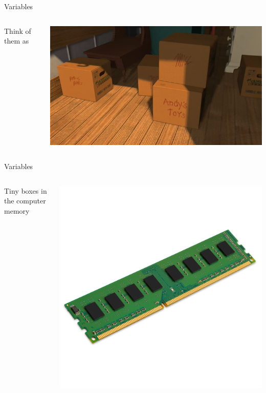 		\begin{frame}{Variables}
			\begin{columns}[T]
				\begin{column}{0.4\textwidth}
					\centering
					\LARGE
					Think of them as
					\pause					
				\end{column}
				\begin{column}{0.6\textwidth}
					\centering
					\includegraphics[width=\textwidth]{images/box.png}
				\end{column}
			\end{columns}
		\end{frame}
		
		\begin{frame}{Variables}
			\begin{columns}[T]
				\begin{column}{0.6\textwidth}
					\centering
					\LARGE
					Tiny boxes in the computer memory
					\pause					
				\end{column}
				\begin{column}{0.4\textwidth}
					\centering
					\includegraphics[width=\textwidth]{images/memory.jpg}
				\end{column}
			\end{columns}
		\end{frame}
		
